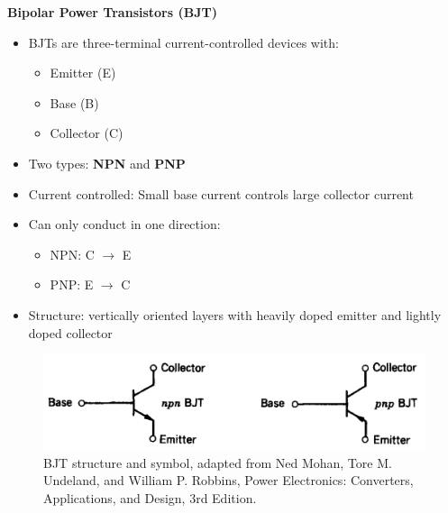 \begin{frame}{\textbf{Bipolar Power Transistors (BJT)}}
\begin{itemize}
    \item BJTs are three-terminal current-controlled devices with:
    \begin{itemize}
        \item Emitter (E)
        \item Base (B)
        \item Collector (C)
    \end{itemize}
    \item Two types: \textbf{NPN} and \textbf{PNP}
    \item Current controlled: Small base current controls large collector current
    \item Can only conduct in one direction:
    \begin{itemize}
        \item NPN: C $\rightarrow$ E
        \item PNP: E $\rightarrow$ C
    \end{itemize}
    \item Structure: vertically oriented layers with heavily doped emitter and lightly doped collector
\end{itemize}
\begin{figure}
    \centering
    \includegraphics[width=0.5\linewidth]{fig/lec04/pnp_npn.png}
    \caption{BJT structure and symbol, adapted from Ned Mohan, Tore M. Undeland, and William P. Robbins, Power Electronics: Converters, Applications, and Design, 3rd Edition.}
    \label{fig:bjt_structure}
\end{figure}
\end{frame}

